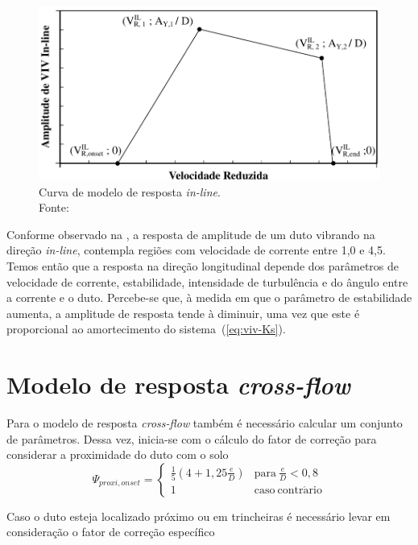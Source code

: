 \begin{figure}[th!]
    \centering
    \includegraphics[width=0.8\linewidth]{imagens/response_model_IL}
    \caption[Curva de modelo de resposta \textit{in-line}]{Curva de modelo de resposta \textit{in-line}.\\Fonte:~}
    \label{fig:viv-responsemodelil}
\end{figure}

Conforme observado na , a resposta de amplitude de um duto vibrando na direção \textit{in-line}, contempla regiões com velocidade de corrente entre 1,0 e 4,5.
Temos então que a resposta na direção longitudinal depende dos parâmetros de velocidade de corrente, estabilidade, intensidade de turbulência e do ângulo entre a corrente e o duto.
Percebe-se que, à medida em que o parâmetro de estabilidade aumenta, a amplitude de resposta tende à diminuir, uma vez que este é proporcional ao amortecimento do sistema~(\autoref{eq:viv-Ks}).


\section{Modelo de resposta \textit{cross-flow}}

Para o modelo de resposta \textit{cross-flow} também  é necessário calcular um conjunto de parâmetros. Dessa vez, inicia-se com o cálculo do fator de correção para considerar a proximidade do duto com o solo
\begin{equation}
\label{eq:viv-Psi}
\Psi_{\mathit{proxi}, \mathit{onset}} =
\left\{
\begin{matrix}
\frac{1}{5}\left(4 + 1,25\frac{e}{D} \right) & \mathrm{para}~\frac{e}{D} < 0,8\\
1                                            & \mathrm{caso~contr\acute{a}rio}
\end{matrix}
\right.
\end{equation}

Caso o duto esteja localizado próximo ou em trincheiras é necessário levar em consideração o fator de correção específico

